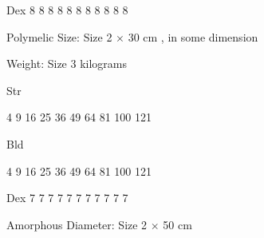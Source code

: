 \documentclass[twoside]{book}
\begin{document}
                  
                   Dex   
                   8   
                   8   
                   8   
                   8   
                   8   
                   8   
                   8   
                   8   
                   8   
                   8   
                   8   
                  
                  
                   Polymelic   
                    Size:   
                         Size  2 
                            \ensuremath{\times}  30  cm
                             , in some dimension
                    
                  
                  
                    
                     Weight:    Size
                      3    kilograms  
                     
                    
                  
                  
                   Str   
                  
                    
                    
                   4   
                   9   
                   16   
                   25   
                   36   
                   49   
                   64   
                   81   
                   100   
                   121   
                  
                  
                   Bld   
                  
                    
                    
                   4   
                   9   
                   16   
                   25   
                   36   
                   49   
                   64   
                   81   
                   100   
                   121   
                  
                  
                   Dex   
                   7   
                   7   
                   7   
                   7   
                   7   
                   7   
                   7   
                   7   
                   7   
                   7   
                   7   
                  
                  
                   Amorphous   
                    Diameter:   
                         Size  2 
                             \ensuremath{\times}  50  cm
                             
                    
                  
\end{document}
